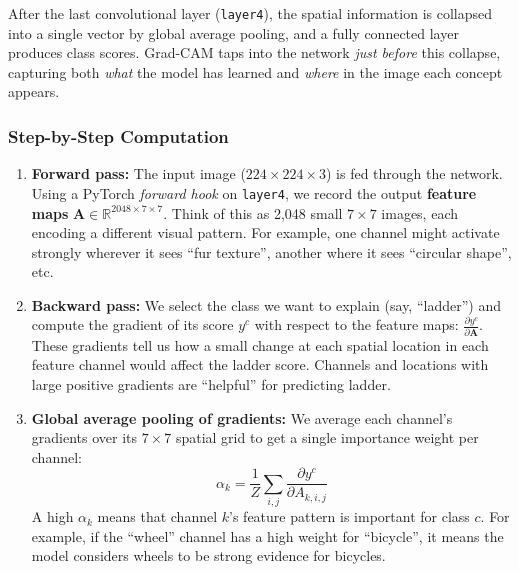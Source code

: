 \documentclass[12pt, a4paper]{article}
\begin{document}
After the last convolutional layer (\texttt{layer4}), the spatial information
is collapsed into a single vector by global average pooling, and a fully
connected layer produces class scores.  Grad-CAM taps into the network
\emph{just before} this collapse, capturing both \emph{what} the model has
learned and \emph{where} in the image each concept appears.

\subsubsection{Step-by-Step Computation}

\begin{enumerate}[leftmargin=*]
    \item \textbf{Forward pass:} The input image ($224 \times 224 \times 3$) is
          fed through the network.  Using a PyTorch \emph{forward hook} on
          \texttt{layer4}, we record the output \textbf{feature maps}
          $\mathbf{A} \in \mathbb{R}^{2048 \times 7 \times 7}$.  Think of
          this as 2{,}048 small $7 \times 7$ images, each encoding a different
          visual pattern.  For example, one channel might activate strongly
          wherever it sees ``fur texture'', another where it sees ``circular
          shape'', etc.

    \item \textbf{Backward pass:} We select the class we want to explain (say,
          ``ladder'') and compute the gradient of its score $y^c$ with
          respect to the feature maps:
          $\frac{\partial y^c}{\partial \mathbf{A}}$.  These gradients tell us
          how a small change at each spatial location in each feature channel
          would affect the ladder score.  Channels and locations with large
          positive gradients are ``helpful'' for predicting ladder.

    \item \textbf{Global average pooling of gradients:} We average each
          channel's gradients over its $7 \times 7$ spatial grid to get a
          single importance weight per channel:
          \begin{equation}
          \alpha_k = \frac{1}{Z} \sum_{i,j} \frac{\partial y^c}{\partial A_{k,i,j}}
          \end{equation}
          A high $\alpha_k$ means that channel $k$'s feature pattern is
          important for class $c$.  For example, if the ``wheel'' channel has
          a high weight for ``bicycle'', it means the model considers wheels
          to be strong evidence for bicycles.


\end{enumerate}
\end{document}
